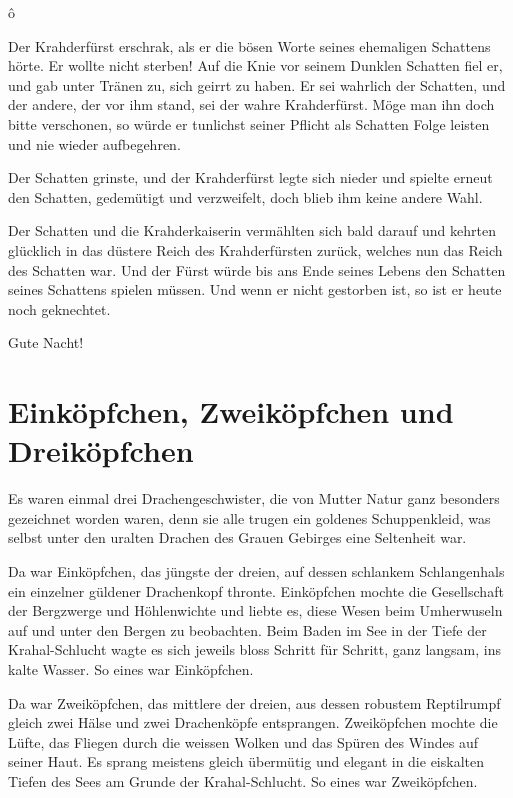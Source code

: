 \documentclass[10pt, a4paper, oneside]{book}
\newcommand{\trennzeichen}{%
    \begin{center}%
        \vspace*{-1em}
        \andorfont\Huge{ô}
    \end{center}
}
\begin{document}
\trennzeichen



Der Krahderfürst erschrak, als er die bösen Worte seines ehemaligen Schattens hörte. Er wollte nicht sterben! Auf die Knie vor seinem Dunklen Schatten fiel er, und gab unter Tränen zu, sich geirrt zu haben. Er sei wahrlich der Schatten, und der andere, der vor ihm stand, sei der wahre Krahderfürst. Möge man ihn doch bitte verschonen, so würde er tunlichst seiner Pflicht als Schatten Folge leisten und nie wieder aufbegehren.

Der Schatten grinste, und der Krahderfürst legte sich nieder und spielte erneut den Schatten, gedemütigt und verzweifelt, doch blieb ihm keine andere Wahl.

Der Schatten und die Krahderkaiserin vermählten sich bald darauf und kehrten glücklich in das düstere Reich des Krahderfürsten zurück, welches nun das Reich des Schatten war. Und der Fürst würde bis ans Ende seines Lebens den Schatten seines Schattens spielen müssen. Und wenn er nicht gestorben ist, so ist er heute noch geknechtet.\bigskip



Gute Nacht!




\newpage
\section{Einköpfchen, Zweiköpfchen und Dreiköpfchen}



Es waren einmal drei Drachengeschwister, die von Mutter Natur ganz besonders gezeichnet worden waren, denn sie alle trugen ein goldenes Schuppenkleid, was selbst unter den uralten Drachen des Grauen Gebirges eine Seltenheit war.



Da war Einköpfchen, das jüngste der dreien, auf dessen schlankem Schlangenhals ein einzelner güldener Drachenkopf thronte. Einköpfchen mochte die Gesellschaft der Bergzwerge und Höhlenwichte und liebte es, diese Wesen beim Umherwuseln auf und unter den Bergen zu beobachten. Beim Baden im See in der Tiefe der Krahal-Schlucht wagte es sich jeweils bloss Schritt für Schritt, ganz langsam, ins kalte Wasser. So eines war Einköpfchen.



Da war Zweiköpfchen, das mittlere der dreien, aus dessen robustem Reptilrumpf gleich zwei Hälse und zwei Drachenköpfe entsprangen. Zweiköpfchen mochte die Lüfte, das Fliegen durch die weissen Wolken und das Spüren des Windes auf seiner Haut. Es sprang meistens gleich übermütig und elegant in die eiskalten Tiefen des Sees am Grunde der Krahal-Schlucht. So eines war Zweiköpfchen.
\end{document}
